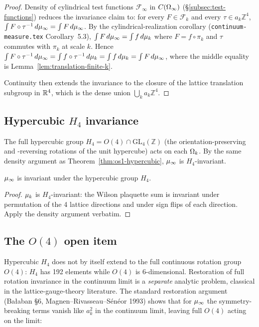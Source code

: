 \begin{proof}
Density of cylindrical test functions $\mathcal{F}_\infty$ in
$C(\Omega_\infty)$ (\S\ref{subsec:test-functions}) reduces the invariance
claim to: for every $F \in \mathcal{F}_k$ and every
$\tau \in a_k \mathbb{Z}^4$, $\int F \circ \tau^{-1} \, d\mu_\infty = \int F \, d\mu_\infty$.
By the cylindrical-realization corollary
(\texttt{continuum-measure.tex} Corollary~5.3),
$\int F \, d\mu_\infty = \int f \, d\mu_k$ where $F = f \circ \pi_k$ and
$\tau$ commutes with $\pi_k$ at scale $k$.  Hence
$\int F \circ \tau^{-1} \, d\mu_\infty = \int f \circ \tau^{-1} \, d\mu_k
= \int f \, d\mu_k = \int F \, d\mu_\infty$, where the middle equality is
Lemma~\ref{lem:translation-finite-k}.

Continuity then extends the invariance to the closure of the lattice
translation subgroup in $\mathbb{R}^4$, which is the dense union
$\bigcup_k a_k \mathbb{Z}^4$.
\end{proof}

\subsection{Hypercubic $H_4$ invariance}
\label{subsec:hypercubic-h4}

The full hypercubic group $H_4 = O(4) \cap \mathrm{GL}_4(\mathbb{Z})$
(the orientation-preserving and -reversing rotations of the unit
hypercube) acts on each $\Omega_k$.  By the same density argument as
Theorem~\ref{thm:os1-hypercubic}, $\mu_\infty$ is $H_4$-invariant.

\begin{theorem}
\label{thm:H4}
$\mu_\infty$ is invariant under the hypercubic group $H_4$.
\end{theorem}

\begin{proof}
$\mu_k$ is $H_4$-invariant: the Wilson plaquette sum is invariant under
permutation of the 4 lattice directions and under sign flips of each
direction.  Apply the density argument verbatim.
\end{proof}

\subsection{The $O(4)$ open item}
\label{sec:rotation-restoration}

Hypercubic $H_4$ does not by itself extend to the full continuous
rotation group $O(4)$: $H_4$ has 192 elements while $O(4)$ is
$6$-dimensional.  Restoration of full rotation invariance in the
continuum limit is a \emph{separate} analytic problem, classical in
the lattice-gauge-theory literature.  The standard restoration
argument (Bałaban \S6, Magnen--Rivasseau--Sénéor 1993) shows that for
$\mu_\infty$ the symmetry-breaking terms vanish like $a_k^2$ in the
continuum limit, leaving full $O(4)$ acting on the limit:

